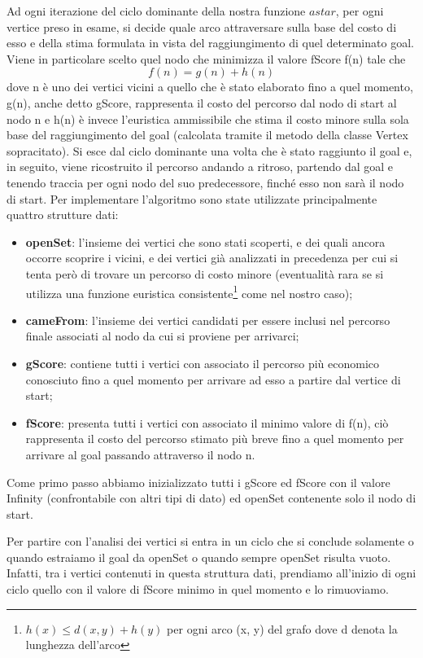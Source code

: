 \documentclass[12pt,a4paper]{report}
\begin{document}
Ad ogni iterazione del ciclo dominante della nostra funzione \(astar\), per ogni vertice preso in esame, si decide quale arco attraversare sulla base del costo di esso e della stima formulata in vista del raggiungimento di quel determinato goal.
Viene in particolare scelto quel nodo che minimizza il valore fScore f(n) tale che\[f(n) = g(n) + h(n)\]dove n è uno dei vertici vicini a quello che è stato elaborato fino a quel momento, g(n), anche detto gScore, rappresenta il costo del percorso dal nodo di start al nodo n e h(n) è invece l'euristica ammissibile che stima il costo minore sulla sola base del raggiungimento del goal (calcolata tramite il metodo della classe Vertex sopracitato). Si esce dal ciclo dominante una volta che è stato raggiunto il goal e, in seguito, viene ricostruito il percorso andando a ritroso, partendo dal goal e tenendo traccia per ogni nodo del suo predecessore, finché esso non sarà il nodo di start. 
\newpage
Per implementare l'algoritmo sono state utilizzate principalmente quattro strutture dati:
\begin{itemize}
	\item \textbf{openSet}: l'insieme dei vertici che sono stati scoperti, e dei quali ancora occorre scoprire i vicini, e dei vertici già analizzati in precedenza per cui si tenta però di trovare un percorso di costo minore (eventualità rara se si utilizza una funzione euristica consistente\footnote[1]{\(h(x) \leq d(x, y) + h(y)\) per ogni arco (x, y) del grafo dove d denota la lunghezza dell'arco} come nel nostro caso); 
	\item \textbf{cameFrom}: l'insieme dei vertici candidati per essere inclusi nel percorso finale associati al nodo da cui si proviene per arrivarci;
	\item \textbf{gScore}: contiene tutti i vertici con associato il percorso più economico conosciuto fino a quel momento per arrivare ad esso a partire dal vertice di start;
	\item \textbf{fScore}:  presenta tutti i vertici con associato il minimo valore di f(n), ciò rappresenta il costo del percorso stimato più breve fino a quel momento per arrivare al goal passando attraverso il nodo n. 
\end{itemize}

Come primo passo abbiamo inizializzato tutti i gScore ed fScore con il valore Infinity (confrontabile con altri tipi di dato) ed openSet contenente solo il nodo di start.

Per partire con l'analisi dei vertici si entra in un ciclo che si conclude solamente o quando estraiamo il goal da openSet o quando sempre openSet risulta vuoto. Infatti, tra i vertici contenuti in questa struttura dati, prendiamo all'inizio di ogni ciclo quello con il valore di fScore minimo in quel momento e lo rimuoviamo.
\end{document}
